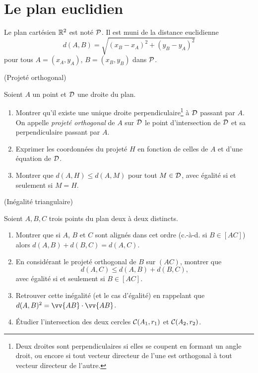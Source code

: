 \documentclass[a4paper,11pt,reqno]{amsart}
\begin{document}

\section{Le plan euclidien}

\begin{convention}
  Le plan cartésien $\mathbb{R}^2$ est noté $\mathcal{P}$. Il est muni de la distance euclidienne
  \[
    d(A,B)=\sqrt{(x_B-x_A)^2+(y_B-y_A)^2}
  \]
  pour tous $A=(x_A,y_A)$, $B=(x_B,y_B)$ dans $\mathcal{P}$.
\end{convention}


\begin{exo} (Projeté orthogonal)

  Soient $A$ un point et $\mathcal{D}$ une droite du plan.
  \begin{enumerate}
     \item Montrer qu'il existe une unique droite perpendiculaire\footnote{Deux droites sont perpendiculaires si elles se coupent en formant un angle droit, ou encore si tout vecteur directeur de l'une est orthogonal à tout vecteur directeur de l'autre.} à $\mathcal{D}$ passant par $A$. On appelle \emph{projeté orthogonal} de $A$ sur $\mathcal{D}$ le point d'intersection de $\mathcal{D}$ et sa perpendiculaire passant par $A$.
     \item Exprimer les coordonnées du projeté $H$ en fonction de celles de $A$ et d'une équation de $\mathcal{D}$.
     \item Montrer que $d(A,H)\leqslant d(A,M)$ pour tout $M \in \mathcal{D}$, avec égalité si et seulement si $M=H$.
  \end{enumerate}
\end{exo}


\begin{exo} (Inégalité triangulaire)

  Soient $A,B,C$ trois points du plan deux à deux distincts.
  \begin{enumerate}
    \item Montrer que si $A$, $B$ et $C$ sont alignés dans cet ordre (c.-à-d. si $B \in [AC]$) alors $d(A,B)+d(B,C)=d(A,C)$.
    \item En considérant le projeté orthogonal de $B$ sur $(AC)$, montrer que
    \[
      d(A,C) \leqslant d(A,B)+d(B,C),
    \]
    avec égalité si et seulement si $B \in [AC]$.
    \item Retrouver cette inégalité (et le cas d'égalité) en rappelant que $d(A,B)^{2}=\vv{AB}\cdot\vv{AB}$.
    \item Étudier l'intersection des deux cercles $\mathcal{C}(A_1,r_1)$ et $\mathcal{C}(A_2,r_2)$.
  \end{enumerate}
\end{exo}
\end{document}
